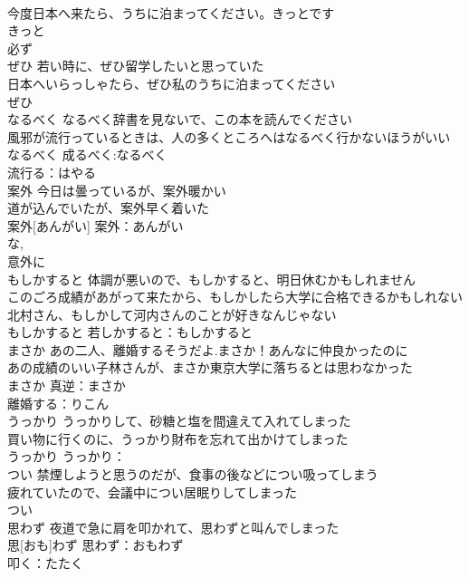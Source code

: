 \documentclass[8pt]{extreport}
\begin{document}
\begin{CJK}{UTF8}{min}
\\	今度日本へ来たら、うちに泊まってください。きっとです 
\\	きっと			
\\	必ず 
\\	ぜひ	若い時に、ぜひ留学したいと思っていた 
\\	日本へいらっしゃたら、ぜひ私のうちに泊まってください 
\\	ぜひ						
\\	なるべく	なるべく辞書を見ないで、この本を読んでください 
\\	風邪が流行っているときは、人の多くところへはなるべく行かないほうがいい 
\\	なるべく			成るべく:なるべく
\\	流行る：はやる
\\	案外	今日は曇っているが、案外暖かい 
\\	道が込んでいたが、案外早く着いた 
\\	案外[あんがい]			案外：あんがい
\\	な, 
\\	意外に 
\\	もしかすると	体調が悪いので、もしかすると、明日休むかもしれません 
\\	このごろ成績があがって来たから、もしかしたら大学に合格できるかもしれない 
\\	北村さん、もしかして河内さんのことが好きなんじゃない 
\\	もしかすると			若しかすると：もしかすると
\\	まさか	あの二人、離婚するそうだよ.まさか！あんなに仲良かったのに 
\\	あの成績のいい子林さんが、まさか東京大学に落ちるとは思わなかった 
\\	まさか			真逆：まさか
\\	離婚する：りこん
\\	うっかり	うっかりして、砂糖と塩を間違えて入れてしまった 
\\	買い物に行くのに、うっかり財布を忘れて出かけてしまった 
\\	うっかり			うっかり：
\\	つい	禁煙しようと思うのだが、食事の後などについ吸ってしまう 
\\	疲れていたので、会議中につい居眠りしてしまった 
\\	つい						
\\	思わず	夜道で急に肩を叩かれて、思わずと叫んでしまった 
\\	思[おも]わず			思わず：おもわず
\\	叩く：たたく

\end{CJK}
\end{document}
